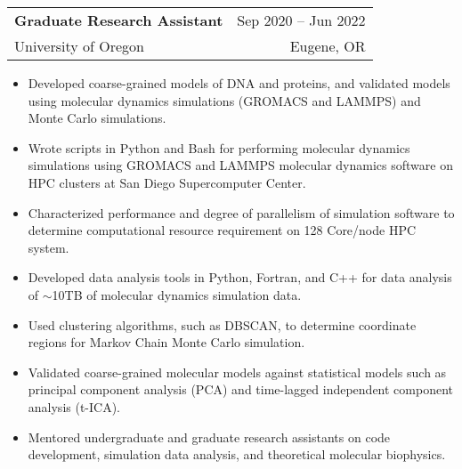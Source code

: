 \documentclass[letterpaper,10.8pt]{article}
\makeatletter
\newcommand{\resumeSubheading}[4]{
  \vspace{-1pt} \item
    \begin{tabular*}{0.97\textwidth}{l@{\extracolsep{\fill}}r}
      \textbf{#1} & #2 \\
      #3  &  #4 \\
    \end{tabular*}\vspace{-5pt}
}
\makeatother
\begin{document}
    \resumeSubheading
		{Graduate Research Assistant}{Sep 2020 – Jun 2022}
		{University of Oregon}{Eugene, OR}
	\begin{itemize}[leftmargin=*,label={$\diamond$}]
	\itemsep0em  %
	
	
	\item{Developed coarse-grained models of DNA and proteins, and validated models using molecular dynamics simulations (GROMACS and LAMMPS) and Monte Carlo simulations.}
	
	
	\item{Wrote scripts in Python and Bash for performing molecular dynamics simulations using GROMACS and LAMMPS molecular dynamics software on HPC clusters at San Diego Supercomputer Center.}
	
	\item{Characterized performance and degree of parallelism of simulation software to determine computational resource requirement on 128 Core/node HPC system.}

	\item{Developed data analysis tools in Python, Fortran, and C++ for data analysis of $\sim$10TB of molecular dynamics simulation data.}
	
	
	\item{Used clustering algorithms, such as DBSCAN, to determine coordinate regions for Markov Chain Monte Carlo simulation.}
	
	\item{Validated coarse-grained molecular models against statistical models such as principal component analysis (PCA) and time-lagged independent component analysis (t-ICA).}
	
	\item{Mentored undergraduate and graduate research assistants on code development, simulation data analysis, and theoretical molecular biophysics.}
	
	
	\end{itemize} %
	
\end{document}
